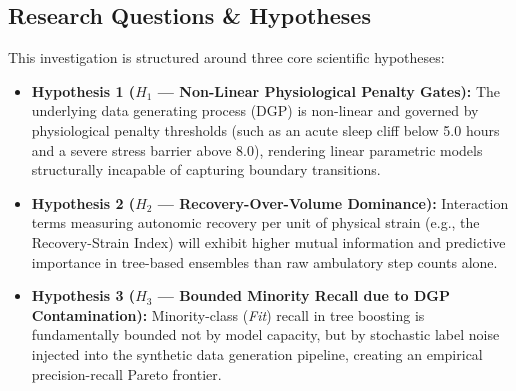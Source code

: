 \documentclass[11pt,a4paper]{article}
\begin{document}
\subsection{Research Questions \& Hypotheses}
This investigation is structured around three core scientific hypotheses:
\begin{itemize}[leftmargin=*,itemsep=1pt]
    \item \textbf{Hypothesis 1 ($H_1$ --- Non-Linear Physiological Penalty Gates):} The underlying data generating process (DGP) is non-linear and governed by physiological penalty thresholds (such as an acute sleep cliff below 5.0 hours and a severe stress barrier above 8.0), rendering linear parametric models structurally incapable of capturing boundary transitions.
    \item \textbf{Hypothesis 2 ($H_2$ --- Recovery-Over-Volume Dominance):} Interaction terms measuring autonomic recovery per unit of physical strain (e.g., the Recovery-Strain Index) will exhibit higher mutual information and predictive importance in tree-based ensembles than raw ambulatory step counts alone.
    \item \textbf{Hypothesis 3 ($H_3$ --- Bounded Minority Recall due to DGP Contamination):} Minority-class (\emph{Fit}) recall in tree boosting is fundamentally bounded not by model capacity, but by stochastic label noise injected into the synthetic data generation pipeline, creating an empirical precision-recall Pareto frontier.
\end{itemize}
\end{document}
